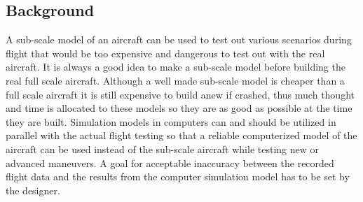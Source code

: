\subsection{Background}

A sub-scale model of an aircraft can be used to test out various scenarios during flight that would be too expensive and dangerous to test out with the real aircraft. It is always a good idea to make a sub-scale model before building the real full scale aircraft. Although a well made sub-scale model is cheaper than a full scale aircraft it is still expensive to build anew if crashed, thus much thought and time is allocated to these models so they are as good as possible at the time they are built. Simulation models in computers can and should be utilized in parallel with the actual flight testing so that a reliable computerized model of the aircraft can be used instead of the sub-scale aircraft while testing new or advanced maneuvers. A goal for acceptable inaccuracy between the recorded flight data and the results from the computer simulation model has to be set by the designer.
